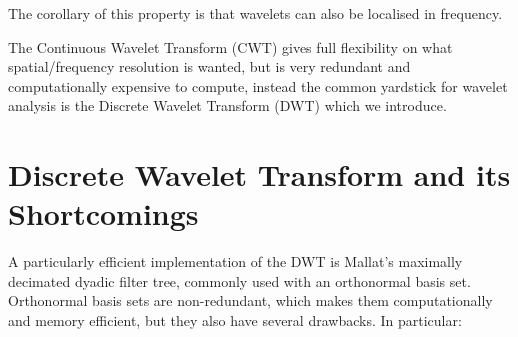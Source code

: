   The corollary of this property is that wavelets can also be localised in
  frequency.

  The Continuous Wavelet Transform (CWT) gives full flexibility on what
  spatial/frequency resolution is wanted, but is very redundant and
  computationally expensive to compute, instead the common yardstick for
  wavelet analysis is the Discrete Wavelet Transform (DWT) which we introduce.

% 
\section{Discrete Wavelet Transform and its Shortcomings}\label{sec:dwt_problems}
  A particularly efficient implementation of the 
  DWT is Mallat's maximally decimated dyadic filter tree, commonly used with
  an orthonormal basis set.  Orthonormal basis sets are non-redundant, which
  makes them computationally and memory efficient, but they also have several
  drawbacks. In particular:

